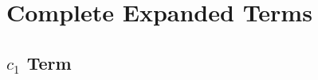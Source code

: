 \documentclass[12pt]{article}
\begin{document}

\newpage
\section{Complete Expanded Terms}
\subsection{$c_{1}$ Term}

\newpage

\newpage

\newpage

\newpage

%
%
%
%
%
%
%
\end{document}
